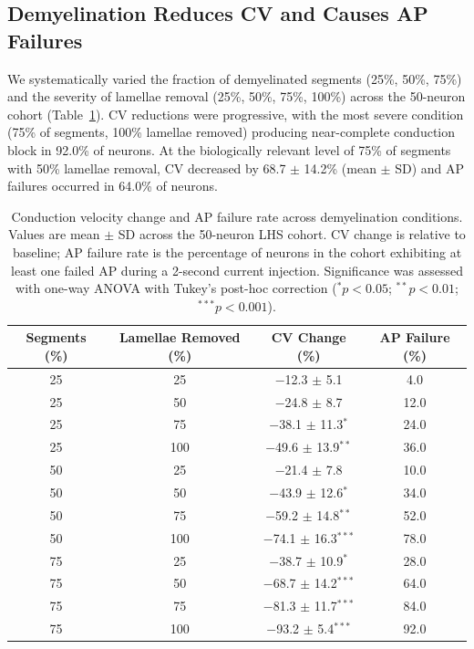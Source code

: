 \documentclass[11pt]{article}
\begin{document}
\subsection{Demyelination Reduces CV and Causes AP Failures}

We systematically varied the fraction of demyelinated segments (25\%, 50\%, 75\%) and the severity of lamellae removal (25\%, 50\%, 75\%, 100\%) across the 50-neuron cohort (Table~\ref{tab:demyelination}). CV reductions were progressive, with the most severe condition (75\% of segments, 100\% lamellae removed) producing near-complete conduction block in 92.0\% of neurons. At the biologically relevant level of 75\% of segments with 50\% lamellae removal, CV decreased by 68.7 $\pm$ 14.2\% (mean $\pm$ SD) and AP failures occurred in 64.0\% of neurons.

\begin{table}[H]
\centering
\caption{Conduction velocity change and AP failure rate across demyelination conditions. Values are mean $\pm$ SD across the 50-neuron LHS cohort. CV change is relative to baseline; AP failure rate is the percentage of neurons in the cohort exhibiting at least one failed AP during a 2-second current injection. Significance was assessed with one-way ANOVA with Tukey's post-hoc correction ($^\ast p<0.05$; $^{\ast\ast} p<0.01$; $^{\ast\ast\ast} p<0.001$).}
\label{tab:demyelination}
\begin{tabular}{cccc}
\toprule
\textbf{Segments (\%)} & \textbf{Lamellae Removed (\%)} & \textbf{CV Change (\%)} & \textbf{AP Failure (\%)} \\
\midrule
25 & 25 & $-$12.3 $\pm$ 5.1 & 4.0 \\
25 & 50 & $-$24.8 $\pm$ 8.7 & 12.0 \\
25 & 75 & $-$38.1 $\pm$ 11.3$^{\ast}$ & 24.0 \\
25 & 100 & $-$49.6 $\pm$ 13.9$^{\ast\ast}$ & 36.0 \\
50 & 25 & $-$21.4 $\pm$ 7.8 & 10.0 \\
50 & 50 & $-$43.9 $\pm$ 12.6$^{\ast}$ & 34.0 \\
50 & 75 & $-$59.2 $\pm$ 14.8$^{\ast\ast}$ & 52.0 \\
50 & 100 & $-$74.1 $\pm$ 16.3$^{\ast\ast\ast}$ & 78.0 \\
75 & 25 & $-$38.7 $\pm$ 10.9$^{\ast}$ & 28.0 \\
75 & 50 & $-$68.7 $\pm$ 14.2$^{\ast\ast\ast}$ & 64.0 \\
75 & 75 & $-$81.3 $\pm$ 11.7$^{\ast\ast\ast}$ & 84.0 \\
75 & 100 & $-$93.2 $\pm$ 5.4$^{\ast\ast\ast}$ & 92.0 \\
\bottomrule
\end{tabular}
\end{table}
\end{document}
